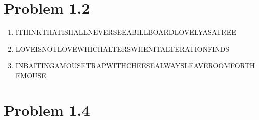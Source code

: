 \documentclass{article}
\author{Isaac Boaz}
\begin{document}
\section*{Problem 1.2}
\begin{enumerate}[label=(\alph*)]
    \item ITHINKTHATISHALLNEVERSEEABILLBOARDLOVELYASATREE
    \item LOVEISNOTLOVEWHICHALTERSWHENITALTERATIONFINDS
    \item INBAITINGAMOUSETRAPWITHCHEESEALWAYSLEAVEROOMFORTHEMOUSE 
\end{enumerate}

\section*{Problem 1.4}
\end{document}
